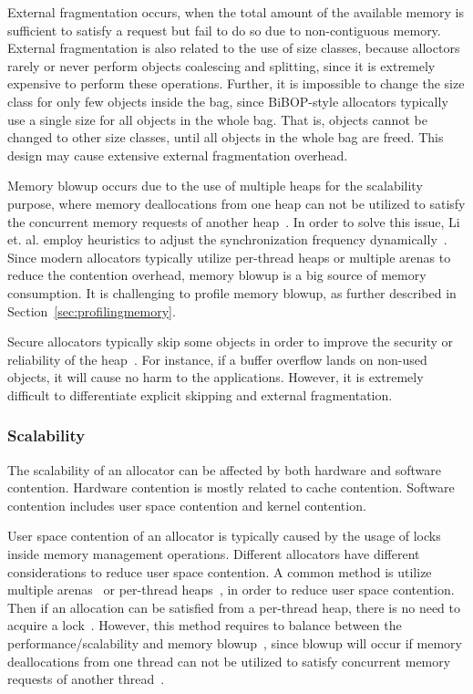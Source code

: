 External fragmentation occurs, when the total amount of the available memory is sufficient to satisfy a request but fail to do so due to non-contiguous memory. External fragmentation is also related to the use of size classes, because alloctors rarely or never perform objects coalescing and splitting, since it is extremely expensive to perform these operations. Further, it is impossible to change the size class for only few objects inside the bag, since BiBOP-style allocators typically use a single size for all objects in the whole bag. That is, objects cannot be changed to other size classes, until all objects in the whole bag are freed. This design may cause extensive external fragmentation overhead. 

Memory blowup occurs due to the use of multiple heaps for the scalability purpose, where memory deallocations from one heap can not be utilized to satisfy the concurrent memory requests of another heap~\cite{Hoard}. In order to solve this issue, Li et. al. employ heuristics to adjust the synchronization frequency dynamically~\cite{DBLP:conf/iwmm/LiLD19}. Since modern allocators typically utilize per-thread heaps or multiple arenas to reduce the contention overhead,  memory blowup is a big source of memory consumption. It is challenging to profile memory blowup, as further described in Section~\ref{sec:profilingmemory}. 

Secure allocators typically skip some objects in order to improve the security or reliability of the heap~\cite{DieHarder, Guarder}. For instance, if a buffer overflow lands on non-used objects, it will cause no harm to the applications. However, it is extremely difficult to differentiate explicit skipping and external fragmentation. 

\subsubsection{Scalability} 
\label{sec:scalability}

The scalability of an allocator can be affected by both hardware and software contention. Hardware contention is mostly related to cache contention. Software contention includes user space contention and kernel contention. 

User space contention of an allocator is typically caused by the usage of locks inside memory management operations. Different allocators have different considerations to reduce user space contention. A common method is utilize multiple arenas~\citep{dlmalloc} or per-thread heaps~\citep{Hoard}, in order to reduce user space contention. Then if an allocation can be satisfied from a per-thread heap, there is no need to acquire a lock~\citep{tcmalloc, jemalloc}. However, this method requires to balance between the performance/scalability and memory blowup~\citep{Hoard}, since blowup will occur if memory deallocations from one thread can not be utilized to satisfy concurrent memory requests of another thread~\cite{Hoard}. 

